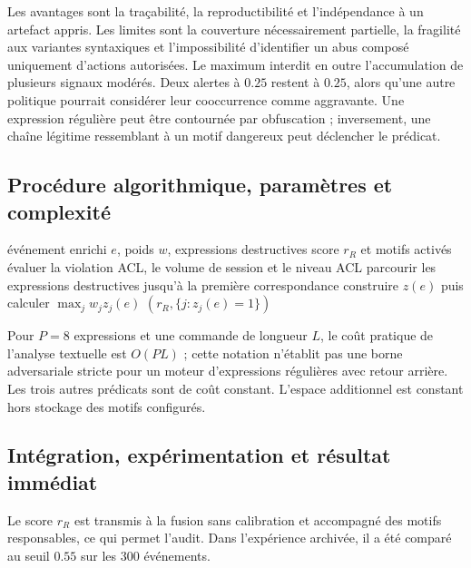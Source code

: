 \documentclass[11pt,a4paper,oneside]{report}
\theoremstyle{definition}
\theoremstyle{plain}
\begin{document}
Les avantages sont la traçabilité, la reproductibilité et l'indépendance à un artefact appris. Les limites sont la couverture nécessairement partielle, la fragilité aux variantes syntaxiques et l'impossibilité d'identifier un abus composé uniquement d'actions autorisées. Le maximum interdit en outre l'accumulation de plusieurs signaux modérés. Deux alertes à $0.25$ restent à $0.25$, alors qu'une autre politique pourrait considérer leur cooccurrence comme aggravante. Une expression régulière peut être contournée par obfuscation ; inversement, une chaîne légitime ressemblant à un motif dangereux peut déclencher le prédicat.

\subsection*{Procédure algorithmique, paramètres et complexité}

\begin{algorithm}[H]
\caption{Évaluation déterministe d'un événement}
\label{alg:ai-ro-rules}
\begin{algorithmic}[1]
\Require événement enrichi $e$, poids $w$, expressions destructives
\Ensure score $r_R$ et motifs activés
\State évaluer la violation ACL, le volume de session et le niveau ACL
\State parcourir les expressions destructives jusqu'à la première correspondance
\State construire $z(e)$ puis calculer $\max_j w_jz_j(e)$
\State \Return $(r_R,\{j:z_j(e)=1\})$
\end{algorithmic}
\end{algorithm}

Pour $P=8$ expressions et une commande de longueur $L$, le coût pratique de l'analyse textuelle est $O(PL)$ ; cette notation n'établit pas une borne adversariale stricte pour un moteur d'expressions régulières avec retour arrière. Les trois autres prédicats sont de coût constant. L'espace additionnel est constant hors stockage des motifs configurés.

\subsection*{Intégration, expérimentation et résultat immédiat}

Le score $r_R$ est transmis à la fusion sans calibration et accompagné des motifs responsables, ce qui permet l'audit. Dans l'expérience archivée, il a été comparé au seuil $0.55$ sur les 300 événements.

\begin{table}[H]
\centering
\caption{Résultat archivé des règles, $n=300$, seuil $0.55$.}
\label{tab:method-rules-results}
\small
{}
\end{table}
\end{document}
